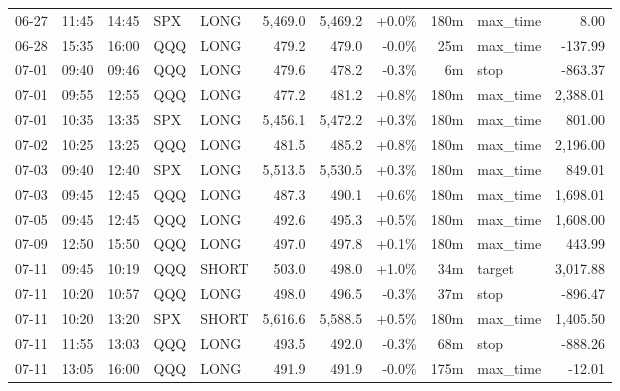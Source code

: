 \documentclass[11pt,a4paper,twoside]{article}
\begin{document}
\begin{center}
\begin{longtable}{>{\color{txtmain}}l l l l l r r r r >{\color{txtmain}}l r}
06-27 & 11:45 & 14:45 & SPX & LONG & 5,469.0 & 5,469.2 & \textcolor{wingreen}{+0.0\%} & 180m & max\_time & \textcolor{wingreen}{8.00} \\
06-28 & 15:35 & 16:00 & QQQ & LONG & 479.2 & 479.0 & \textcolor{lossred}{-0.0\%} & 25m & max\_time & \textcolor{lossred}{-137.99} \\
07-01 & 09:40 & 09:46 & QQQ & LONG & 479.6 & 478.2 & \textcolor{lossred}{-0.3\%} & 6m & stop & \textcolor{lossred}{-863.37} \\
07-01 & 09:55 & 12:55 & QQQ & LONG & 477.2 & 481.2 & \textcolor{wingreen}{+0.8\%} & 180m & max\_time & \textcolor{wingreen}{2,388.01} \\
07-01 & 10:35 & 13:35 & SPX & LONG & 5,456.1 & 5,472.2 & \textcolor{wingreen}{+0.3\%} & 180m & max\_time & \textcolor{wingreen}{801.00} \\
07-02 & 10:25 & 13:25 & QQQ & LONG & 481.5 & 485.2 & \textcolor{wingreen}{+0.8\%} & 180m & max\_time & \textcolor{wingreen}{2,196.00} \\
07-03 & 09:40 & 12:40 & SPX & LONG & 5,513.5 & 5,530.5 & \textcolor{wingreen}{+0.3\%} & 180m & max\_time & \textcolor{wingreen}{849.01} \\
07-03 & 09:45 & 12:45 & QQQ & LONG & 487.3 & 490.1 & \textcolor{wingreen}{+0.6\%} & 180m & max\_time & \textcolor{wingreen}{1,698.01} \\
07-05 & 09:45 & 12:45 & QQQ & LONG & 492.6 & 495.3 & \textcolor{wingreen}{+0.5\%} & 180m & max\_time & \textcolor{wingreen}{1,608.00} \\
07-09 & 12:50 & 15:50 & QQQ & LONG & 497.0 & 497.8 & \textcolor{wingreen}{+0.1\%} & 180m & max\_time & \textcolor{wingreen}{443.99} \\
07-11 & 09:45 & 10:19 & QQQ & SHORT & 503.0 & 498.0 & \textcolor{wingreen}{+1.0\%} & 34m & target & \textcolor{wingreen}{3,017.88} \\
07-11 & 10:20 & 10:57 & QQQ & LONG & 498.0 & 496.5 & \textcolor{lossred}{-0.3\%} & 37m & stop & \textcolor{lossred}{-896.47} \\
07-11 & 10:20 & 13:20 & SPX & SHORT & 5,616.6 & 5,588.5 & \textcolor{wingreen}{+0.5\%} & 180m & max\_time & \textcolor{wingreen}{1,405.50} \\
07-11 & 11:55 & 13:03 & QQQ & LONG & 493.5 & 492.0 & \textcolor{lossred}{-0.3\%} & 68m & stop & \textcolor{lossred}{-888.26} \\
07-11 & 13:05 & 16:00 & QQQ & LONG & 491.9 & 491.9 & \textcolor{lossred}{-0.0\%} & 175m & max\_time & \textcolor{lossred}{-12.01} \\

\end{longtable}
\end{center}
\end{document}
